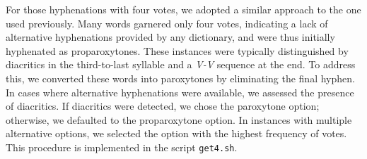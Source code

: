 For those hyphenations with four votes, we adopted a similar approach to the
one used previously. Many words garnered only four votes, indicating a lack of
alternative hyphenations provided by any dictionary, and were thus initially
hyphenated as proparoxytones. These instances were typically distinguished by
diacritics in the third-to-last syllable and a \emph{V-V} sequence at the end.
To address this, we converted these words into paroxytones by eliminating the
final hyphen. In cases where alternative hyphenations were available, we
assessed the presence of diacritics. If diacritics were detected, we chose the
paroxytone option; otherwise, we defaulted to the proparoxytone option. In
instances with multiple alternative options, we selected the option with the
highest frequency of votes. This procedure is implemented in the script
\texttt{get4.sh}.






